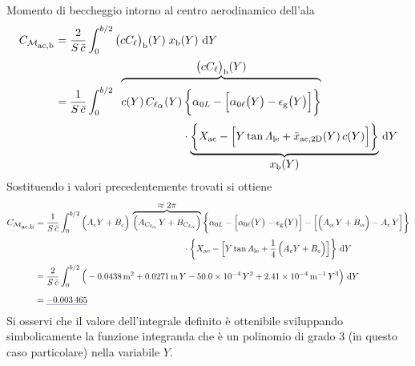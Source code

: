\documentclass[[12pt,twoside]{book}
\begin{document}
\begin{myExampleX}{Momento di beccheggio intorno al centro aerodinamico dell'ala}{}
\[
\begin{split}
C_{\mathcal{M}_\mathlarger{\mathrm{ac,b}}} 
  & {}=
  \frac{2}{S\,\bar{c}} \int_0^{b/2} \big(cC_{\ell}\big)_\mathrm{b}(Y) \; x_\mathrm{b}(Y)\, \diff{Y}
\\[1pt]
  & {}=
  \frac{1}{S\,\bar{c}} \int_0^{b/2} \;\;
\overbrace{%
\rule{0pt}{2em}
c(Y) \, C_{\ell_\mathlarger{\alpha}}(Y) \,
    \bigg\{ \alpha_{0L} - \Big[ \alpha_{0\ell}\big(Y\big) - \epsilon_\mathrm{g}\big(Y\big) \Big] \bigg\}
}^{ \mathlarger{ \big(cC_{\ell}\big)_\mathrm{b}(Y) } }
\\[3pt]
  & \rule{4cm}{0pt}
%
    \cdot
    \underbrace{%
    \bigg\{ 
      X_\mathrm{ac} 
        - \Big[ Y \tan \Lambda_\mathrm{le} + \bar{x}_{\mathrm{ac,2D}} (Y) \, c(Y) \Big]
    \bigg\} 
    }_{ \mathlarger{ x_\mathrm{b}(Y) } }
    \, \diff{Y}
\end{split}
\]
\noindent
Sostituendo i valori precedentemente trovati si ottiene
\[
 \begin{split}
C_{\mathcal{M}_\mathlarger{\mathrm{ac,b}}} 
  & {}=
  \frac{1}{S\,\bar{c}} \int_0^{b/2}
    \Big( A_c Y + B_c \Big)
    \, 
    \overbrace{%
      \Big( A_{C_{\ell_\alpha}} \, Y + B_{C_{\ell_\alpha}} \Big)
    }^{ \mathlarger{\approx 2\pi} }
    \bigg\{ \alpha_{0L} 
       - \Big[ \alpha_{0\ell}\big(Y\big) - \epsilon_\mathrm{g}\big(Y\big) \Big] 
      - \Big[ \Big( A_{\alpha} \, Y + B_{\alpha} \Big) - A_{\epsilon} \, Y \Big]
    \bigg\}
\\[2pt]
  & \hfill \rule{6cm}{0pt}
%
    \cdot
    \bigg\{ 
      X_\mathrm{ac} 
        - \Big[ Y \tan \Lambda_\mathrm{le} + \frac{1}{4} \, \Big( A_c Y + B_c \Big) \Big]
    \bigg\} 
    \, \diff{Y}
\\[2pt]
  & {}= 
  \frac{2}{S\,\bar{c}} \int_0^{b/2} 
    \Big( 
      \SI[round-mode=figures,round-precision=3,
        ]{\myCoeffEWing}{\metre^2}
      + 
      \SI[round-mode=figures,round-precision=3,
        ]{\myCoeffFWing}{\metre}\, Y
      \SI[round-mode=figures,round-precision=3,
        fixed-exponent=-4,
        scientific-notation=fixed %
        ]{\myCoeffGWing}{}\, Y^2
      +
      \SI[round-mode=figures,round-precision=3,
        fixed-exponent=-4,
        scientific-notation=fixed
        ]{\myCoeffHWing}{\metre^{-1}}\, Y^3
    \Big)
    \, \diff{Y}
\\[4pt]
  & {}= \mathunderline{mydarkblue}{ \SI[round-precision=5]{\myCmZeroBWing}{} }
\end{split}
\]
Si osservi che il valore dell'integrale definito è ottenibile sviluppando simbolicamente
la funzione integranda che è un polinomio di grado $3$ (in questo caso particolare) nella variabile $Y$.


\end{myExampleX}
\end{document}

